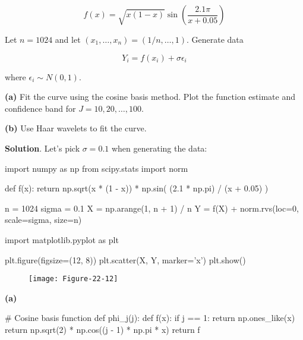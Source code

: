 \[ f(x) = \sqrt{x (1 - x)} \sin \left( \frac{2.1 \pi}{x + 0.05} \right) \]

Let \(n = 1024\) and let \((x_1, \dots, x_n) = (1/n, \dots, 1)\).
Generate data

\[ Y_i = f(x_i) + \sigma \epsilon_i \]

where \(\epsilon_i \sim N(0, 1)\).

\textbf{(a)} Fit the curve using the cosine basis method. Plot the
function estimate and confidence band for \(J = 10, 20, \dots, 100\).

\textbf{(b)} Use Haar wavelets to fit the curve.

\textbf{Solution}. Let's pick \(\sigma = 0.1\) when generating the data:

\begin{python}
import numpy as np
from scipy.stats import norm

def f(x):
    return np.sqrt(x * (1 - x)) * np.sin( (2.1 * np.pi) / (x + 0.05) )

n = 1024
sigma = 0.1
X = np.arange(1, n + 1) / n
Y = f(X) + norm.rvs(loc=0, scale=sigma, size=n)
\end{python}

\begin{python}
import matplotlib.pyplot as plt

plt.figure(figsize=(12, 8))
plt.scatter(X, Y, marker='x')
plt.show()
\end{python}

\begin{figure}[H]
\texttt{[image: Figure-22-12]}
\end{figure}

\textbf{(a)}

\begin{python}
# Cosine basis function
def phi_j(j):
    def f(x):
        if j == 1:
            return np.ones_like(x)
        return np.sqrt(2) * np.cos((j - 1) * np.pi * x)
    return f
\end{python}

